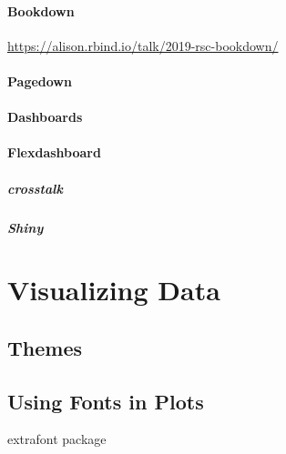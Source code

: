 \documentclass[]{book}
\let\oldparagraph\paragraph
\renewcommand{\paragraph}[1]{\oldparagraph{#1}\mbox{}}
\begin{document}
\hypertarget{bookdown}{%
\subsubsection{Bookdown}\label{bookdown}}

\url{https://alison.rbind.io/talk/2019-rsc-bookdown/}

\hypertarget{pagedown}{%
\subsubsection{Pagedown}\label{pagedown}}

\hypertarget{dashboards}{%
\subsubsection{Dashboards}\label{dashboards}}

\hypertarget{flexdashboard}{%
\subsubsection{Flexdashboard}\label{flexdashboard}}

\hypertarget{crosstalk}{%
\paragraph{crosstalk}\label{crosstalk}}

\hypertarget{shiny}{%
\paragraph{Shiny}\label{shiny}}

\hypertarget{visualizing-data}{%
\chapter{Visualizing Data}\label{visualizing-data}}

\hypertarget{themes}{%
\section{Themes}\label{themes}}

\hypertarget{using-fonts-in-plots}{%
\section{Using Fonts in Plots}\label{using-fonts-in-plots}}

extrafont package
\end{document}
